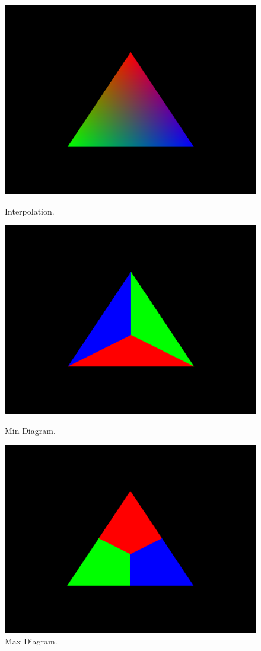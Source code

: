 \documentclass[11pt]{article}
\begin{document}
\begin{figure}[!htb]
    \includegraphics[width=\linewidth]{interpolation.png}
    \caption{Interpolation.}\label{fig:interpolation}
  \endminipage\hfill
    \includegraphics[width=\linewidth]{min.png}
    \caption{Min Diagram.}\label{fig:min}
  \endminipage\hfill
    \includegraphics[width=\linewidth]{max.png}
    \caption{Max Diagram.}\label{fig:max}
  \endminipage
  \end{figure}
\end{document}
